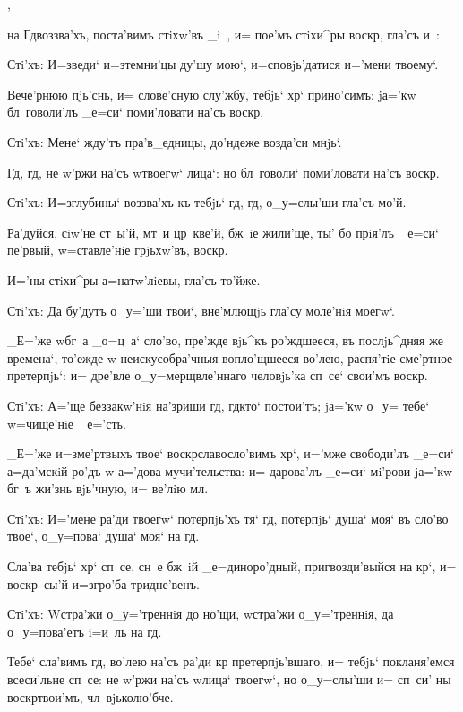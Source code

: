 ,

на Гд воззва'хъ, поста'вимъ стiхw'въ _i~, и= пое'мъ 
стiхи^ры воскр, гла'съ и~:

Стi'хъ: И=зведи` и=з\ъ темни'цы ду'шу мою`, 
и=сповjь'датися и='мени твоему`.

Вече'рнюю пjь'снь, и= слове'сную слу'жбу, тебjь` 
хр` прино'симъ: jа='кw бл~говоли'лъ _е=си` 
поми'ловати на'съ воскр.

Стi'хъ: Мене` жду'тъ пра'в_едницы, до'ндеже возда'си 
мнjь`.

Гд, гд, не w'ржи на'съ w\т твоегw` лица`: но 
бл~говоли` поми'ловати на'съ воскр.

Стi'хъ: И=з\ъ глубины` воззва'хъ къ тебjь` гд, 
гд, о_у=слы'ши гла'съ мо'й.

Ра'дуйся, сiw'не ст~ы'й, мт~и цр~кве'й, бж~iе жили'ще, 
ты' бо прiя'лъ _е=си` пе'рвый, w=ставле'нiе грjьхw'въ, 
воскр.

И='ны стiхи^ры а=натw'лiевы, гла'съ то'йже.

Стi'хъ: Да бу'дутъ о_у='ши твои`, вне'млющjь гла'су 
моле'нiя моегw`.

_Е='же w\т бг~а _о=ц~а` сло'во, пре'жде вjь^къ 
ро'ждшееся, въ послjь^дняя же времена`, то'ежде w\т 
неискусобра'чныя вопло'щшееся во'лею, распя'тiе сме'ртное 
претерпjь`: и= дре'вле о_у=мерщвле'ннаго человjь'ка 
сп~се` свои'мъ воскр.

Стi'хъ: А='ще беззакw'нiя на'зриши гд, гд кто` 
постои'тъ; jа='кw о_у= тебе` w=чище'нiе _е='сть.

_Е='же и=з\ъ ме'ртвыхъ твое` воскр славосло'вимъ 
хр`, и='мже свободи'лъ _е=си` а=да'мскiй ро'дъ w\т 
а='дова мучи'тельства: и= дарова'лъ _е=си` мi'рови jа='кw 
бг~ъ жи'знь вjь'чную, и= ве'лiю мл.

Стi'хъ: И='мене ра'ди твоегw` потерпjь'хъ тя` гд, 
потерпjь` душа` моя` въ сло'во твое`, о_у=пова` душа` 
моя` на гд.

Сла'ва тебjь` хр` сп~се, сн~е бж~iй 
_е=диноро'дный, пригвозди'выйся на кр`, и= 
воскр~сы'й и=з\ъ гро'ба тридне'венъ.

Стi'хъ: W\т стра'жи о_у='треннiя до но'щи, w\т стра'жи 
о_у='треннiя, да о_у=пова'етъ i=и~ль на гд.

Тебе` сла'вимъ гд, во'лею на'съ ра'ди кр 
претерпjь'вшаго, и= тебjь` покланя'емся всеси'льне сп~се: 
не w'ржи на'съ w\т лица` твоегw`, но о_у=слы'ши и= 
сп~си' ны воскр твои'мъ, чл~вjьколю'бче.

